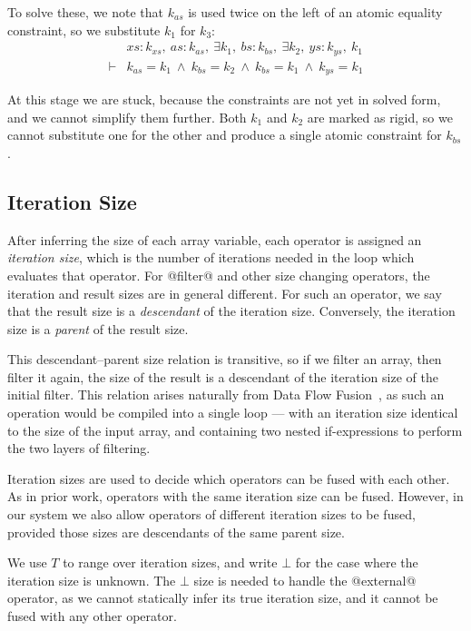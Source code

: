 To solve these, we note that $k_{as}$ is used twice on the left of an atomic equality constraint, so we substitute $k_1$ for $k_3$:
$$
\begin{array}{ll}
       & xs : k_{xs},~ as : k_{as},~ \exists k_1,~ bs : k_{bs},~ \exists k_2,~ ys : k_{ys},~ k_1
\\
\vdash &          k_{as}   = k_1
        ~\wedge~  k_{bs}   = k_2
        ~\wedge~  k_{bs}   = k_1
        ~\wedge~  k_{ys}   = k_1
\end{array}
$$

At this stage we are stuck, because the constraints are not yet in solved form, and we cannot simplify them further. Both $k_1$ and $k_2$ are marked as rigid, so we cannot substitute one for the other and produce a single atomic constraint for $k_{bs}$.


\subsection{Iteration Size}
After inferring the size of each array variable, each operator is assigned an \emph{iteration size}, which is the number of iterations needed in the loop which evaluates that operator. For @filter@ and other size changing operators, the iteration and result sizes are in general different. For such an operator, we say that the result size is a \emph{descendant} of the iteration size. Conversely, the iteration size is a \emph{parent} of the result size. 

This descendant--parent size relation is transitive, so if we filter an array, then filter it again, the size of the result is a descendant of the iteration size of the initial filter. This relation arises naturally from Data Flow Fusion~\cite{lippmeier2013flow}, as such an operation would be compiled into a single loop --- with an iteration size identical to the size of the input array, and containing two nested if-expressions to perform the two layers of filtering.

Iteration sizes are used to decide which operators can be fused with each other. As in prior work, operators with the same iteration size can be fused. However, in our system we also allow operators of different iteration sizes to be fused, provided those sizes are descendants of the same parent size.

We use $T$ to range over iteration sizes, and write $\bot$ for the case where the iteration size is unknown. The $\bot$ size is needed to handle the @external@ operator, as we cannot statically infer its true iteration size, and it cannot be fused with any other operator.

